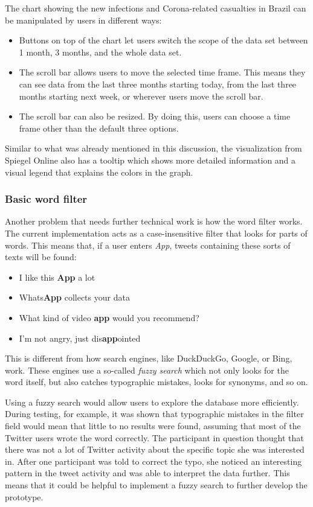 The chart showing the new infections and Corona-related casualties in Brazil can be manipulated by users in different ways:
\begin{itemize}
    \item Buttons on top of the chart let users switch the scope of the data set between 1 month, 3 months, and the whole data set.
    \item The scroll bar allows users to move the selected time frame. This means they can see data from the last three months starting today, from the last three months starting next week, or wherever users move the scroll bar.
    \item The scroll bar can also be resized. By doing this, users can choose a time frame other than the default three options.
\end{itemize}

Similar to what was already mentioned in this discussion, the visualization from Spiegel Online also has a tooltip which shows more detailed information and a visual legend that explains the colors in the graph. 

\subsubsection*{Basic word filter}
Another problem that needs further technical work is how the word filter works. The current implementation acts as a case-insensitive filter that looks for parts of words. This means that, if a user enters \emph{App}, tweets containing these sorts of texts will be found:

\begin{itemize}
    \item I like this \textbf{App} a lot
    \item Whats\textbf{App} collects your data
    \item What kind of video \textbf{app} would you recommend?
    \item I'm not angry, just dis\textbf{app}ointed
\end{itemize}

This is different from how search engines, like DuckDuckGo, Google, or Bing, work. These engines use a so-called \emph{fuzzy search} which not only looks for the word itself, but also catches typographic mistakes, looks for synonyms, and so on.

Using a fuzzy search would allow users to explore the database more efficiently. During testing, for example, it was shown that typographic mistakes in the filter field would mean that little to no results were found, assuming that most of the Twitter users wrote the word correctly. The participant in question thought that there was not a lot of Twitter activity about the specific topic she was interested in. After one participant was told to correct the typo, she noticed an interesting pattern in the tweet activity and was able to interpret the data further. This means that it could be helpful to implement a fuzzy search to further develop the prototype.

